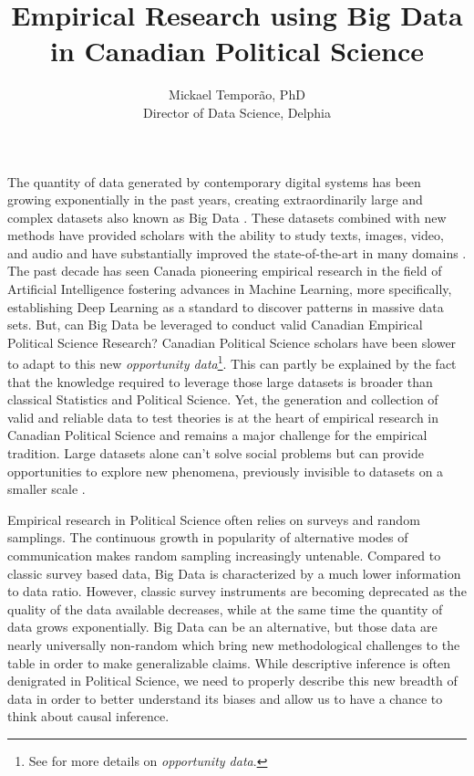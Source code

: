 \documentclass{article}
\author{Mickael Temporão, PhD \\ Director of Data Science, Delphia}
\title{Empirical Research using Big Data in Canadian Political Science}
\begin{document}
\maketitle

The quantity of data generated by contemporary digital systems has been growing exponentially in the past years, creating extraordinarily large and complex datasets also known as Big Data \citep{groves2011three, keller2017evolution, lazer2017data}.
These datasets combined with new methods have provided scholars with the ability to study texts, images, video, and audio and have substantially improved the state-of-the-art in many domains \citep{lecun2015deep}.
The past decade has seen Canada pioneering empirical research in the field of Artificial Intelligence fostering advances in Machine Learning, more specifically, establishing Deep Learning as a standard to discover patterns in massive data sets.
But, can Big Data be leveraged to conduct valid Canadian Empirical Political Science Research?
Canadian Political Science scholars have been slower to adapt to this new \textit{opportunity data}\footnote{See \citet{keller2017evolution} for more details on \textit{opportunity data}.}. This can partly be explained by the fact that the knowledge required to leverage those large datasets is broader than classical Statistics and Political Science.
Yet, the generation and collection of valid and reliable data to test theories is at the heart of empirical research in Canadian Political Science and remains a major challenge for the empirical tradition.
Large datasets alone can't solve social problems but can provide opportunities to explore new phenomena, previously invisible to datasets on a smaller scale \citep{grimmer2015we}.

Empirical research in Political Science often relies on surveys and random samplings.
The continuous growth in popularity of alternative modes of communication makes random sampling increasingly untenable.
Compared to classic survey based data, Big Data is characterized by a much lower information to data ratio.
However, classic survey instruments are becoming deprecated as the quality of the data available decreases, while at the same time the quantity of data grows exponentially.
Big Data can be an alternative, but those data are nearly universally non-random which bring new methodological challenges to the table in order to make generalizable claims.
While descriptive inference is often denigrated in Political Science, we need to properly describe this new breadth of data in order to better understand its biases and allow us to have a chance to think about causal inference.
\end{document}
